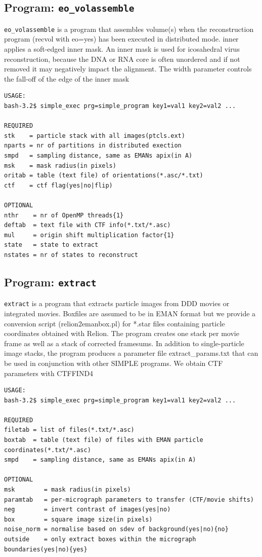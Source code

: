 \documentclass[a4paper,11pt]{article}
\newcommand{\prgname}[1]{\textcolor{NavyBlue}{\texttt{#1}}}
\begin{document}
\subsection{Program: \prgname{eo\_volassemble}}
\label{eo_volassemble}
\prgname{eo\_volassemble} is a program that assembles volume(s) when the reconstruction program (recvol with eo=yes) has been executed in distributed mode. inner applies a soft-edged inner mask. An inner mask is used for icosahedral virus reconstruction, because the DNA or RNA core is often unordered and  if not removed it may negatively impact the alignment. The width parameter controls the fall-off of the edge of the inner mask

\begin{verbatim}
USAGE:
bash-3.2$ simple_exec prg=simple_program key1=val1 key2=val2 ...

REQUIRED
stk    = particle stack with all images(ptcls.ext)
nparts = nr of partitions in distributed exection
smpd   = sampling distance, same as EMANs apix(in A)
msk    = mask radius(in pixels)
oritab = table (text file) of orientations(*.asc/*.txt)
ctf    = ctf flag(yes|no|flip)

OPTIONAL
nthr    = nr of OpenMP threads{1}
deftab  = text file with CTF info(*.txt/*.asc)
mul     = origin shift multiplication factor{1}
state   = state to extract
nstates = nr of states to reconstruct
\end{verbatim}

\subsection{Program: \prgname{extract}}
\label{extract}
\prgname{extract} is a program that extracts particle images from DDD movies or integrated movies. Boxfiles are assumed to be in EMAN format but we provide a conversion script (relion2emanbox.pl) for *.star files containing particle coordinates obtained with Relion. The program creates one stack per movie frame as well as a stack of corrected framesums. In addition to single-particle image stacks, the program produces a parameter file extract\_params.txt that can be used in conjunction with other SIMPLE programs. We obtain CTF parameters with CTFFIND4

\begin{verbatim}
USAGE:
bash-3.2$ simple_exec prg=simple_program key1=val1 key2=val2 ...

REQUIRED
filetab = list of files(*.txt/*.asc)
boxtab  = table (text file) of files with EMAN particle coordinates(*.txt/*.asc)
smpd    = sampling distance, same as EMANs apix(in A)

OPTIONAL
msk        = mask radius(in pixels)
paramtab   = per-micrograph parameters to transfer (CTF/movie shifts)
neg        = invert contrast of images(yes|no)
box        = square image size(in pixels)
noise_norm = normalise based on sdev of background(yes|no){no}
outside    = only extract boxes within the micrograph boundaries(yes|no){yes}
\end{verbatim}
\end{document}

